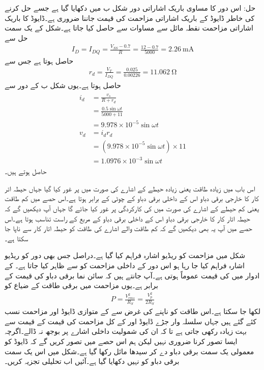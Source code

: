 حل:	اس دور کا مساوی باریک اشاراتی دور شکل  ب میں دکھایا گیا ہے جسے حل کرنے کی خاطر ڈایوڈ کے باریک اشاراتی مزاحمت   کی قیمت جاننا ضروری ہے۔ڈایوڈ کا باریک اشاراتی مزاحمت نقطہ مائل سے مساوات   سے حاصل کیا جاتا ہے۔شکل   کے یک سمت حل سے
\begin{align}
I_D=I_{DQ}=\frac{V_{SS}-0.7}{R}=\frac{12-0.7}{5000}=\SI{2.26}{\milli \ampere}
\end{align}
حاصل ہوتا ہے جس سے
\begin{align}
r_d = \frac{V_T}{I_{DQ}}=\frac{0.025}{0.00226}=\SI{11.062}{\ohm}
\end{align}
حاصل ہوتا ہے۔یوں شکل  ب کے دور سے 
\begin{gather}
\begin{aligned}
i_d &= \frac{v_s}{R+r_d} \\
&=\frac{0.5 \sin \omega t}{5000+11} \\
&=9.978 \times 10^{-5} \sin \omega t\\
v_d &=i_d r_d \\
&= (9.978 \times 10^{-5} \sin \omega t) \times 11 \\
&=1.0976 \times 10^{-3} \sin \omega t
\end{aligned}
\end{gather}
حاصل ہوتے ہیں۔

اس باب میں زیادہ طاقت یعنی زیادہ حیطے کے اشارے کی صورت میں  پر غور کیا گیا جہاں حیطہ اتر کار کا خارجی برقی دباو اس کے داخلی برقی دباو کے چوٹی کے برابر ہوتا ہے۔اس حصے میں کم طاقت یعنی کم حیطے کے اشارے کی صورت  میں  کی کارکردگی پر غور کیا جائے گا جہاں آپ دیکھیں گے کہ حیطہ اتار کار کا خارجی برقی دباو اس کے داخلی برقی دباو کے مربع کے راست تناسب ہوتا ہے۔اس حصے میں آپ یہ بھی دیکھیں گے کہ کم طاقت والے اشارے کی طاقت کو حیطہ اتار کار سے ناپا جا سکتا ہے۔ 

شکل  میں مزاحمت  کو ریڈیو اشارہ  فراہم کیا گیا ہے۔دراصل جس بھی دور کو ریڈیو اشارہ فراہم کیا جا رہا ہو اس دور کے داخلی مزاحمت کو  سے ظاہر کیا جاتا ہے۔ کے ادوار میں  کی قیمت عموماً  ہوتی ہے۔آپ جانتے ہیں کہ سائن نما برقی دباو  کی  قیمت  کے برابر ہے۔یوں مزاحمت  میں برقی طاقت کے ضیاع  کو
\begin{align}\label{مساوات_ڈایوڈ_ذرائع_ابلاغ_طاقت_کا_ناپ}
P=\frac{V^2_{rms}}{R_S}=\frac{V_p^2}{2R_S}
\end{align}
لکھا جا سکتا ہے۔اس طاقت کو ناپنے کی غرض سے  کے متوازی ڈایوڈ اور مزاحمت  نسب کئے گئے ہیں جہاں سلسلہ وار جڑے ڈایوڈ اور  کے کل مزاحمت کی قیمت  کے قیمت سے بہت زیادہ رکھی جاتی ہے تا کہ ان کی شمولیت داخلی اشارے پر بوجھ نہ ڈالے۔اگرچہ ایسا تصور کرنا ضروری نہیں لیکن ہم اس حصے میں تصور کریں گے کہ ڈایوڈ کو معمولی یک سمت برقی دباو دے کر سیدھا مائل رکھا گیا ہے۔شکل میں اس یک سمت برقی دباو کو نہیں دکھایا گیا ہے۔آئیں اب  تحلیلی تجزیہ کریں۔

